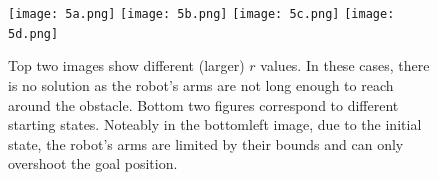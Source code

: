 \documentclass{article}
\begin{document}
    \begin{figure}
        \centering
        \texttt{[image: 5a.png]}
        \texttt{[image: 5b.png]}
        \texttt{[image: 5c.png]}
        \texttt{[image: 5d.png]}
        \caption{Top two images show different (larger) $r$ values. In these cases, there is no solution as the robot's arms are not long enough to reach around the obstacle. Bottom two figures correspond to different starting states. Noteably in the bottomleft image, due to the initial state, the robot's arms are limited by their bounds and can only overshoot the goal position.}
        \label{fig:5}
    \end{figure}
\end{document}
